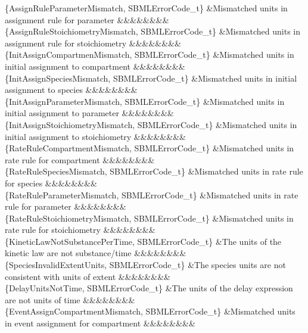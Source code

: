 \begin{DoxyParagraph}{}
\begin{longtabu}
\{Assign\+Rule\+Parameter\+Mismatch, S\+B\+M\+L\+Error\+Code\+\_\+t\} &Mismatched units in assignment rule for parameter &&&&&&&&\\
\{Assign\+Rule\+Stoichiometry\+Mismatch, S\+B\+M\+L\+Error\+Code\+\_\+t\} &Mismatched units in assignment rule for stoichiometry &&&&&&&&\\
\{Init\+Assign\+Compartmen\+Mismatch, S\+B\+M\+L\+Error\+Code\+\_\+t\} &Mismatched units in initial assignment to compartment &&&&&&&&\\
\{Init\+Assign\+Species\+Mismatch, S\+B\+M\+L\+Error\+Code\+\_\+t\} &Mismatched units in initial assignment to species &&&&&&&&\\
\{Init\+Assign\+Parameter\+Mismatch, S\+B\+M\+L\+Error\+Code\+\_\+t\} &Mismatched units in initial assignment to parameter &&&&&&&&\\
\{Init\+Assign\+Stoichiometry\+Mismatch, S\+B\+M\+L\+Error\+Code\+\_\+t\} &Mismatched units in initial assignment to stoichiometry &&&&&&&&\\
\{Rate\+Rule\+Compartment\+Mismatch, S\+B\+M\+L\+Error\+Code\+\_\+t\} &Mismatched units in rate rule for compartment &&&&&&&&\\
\{Rate\+Rule\+Species\+Mismatch, S\+B\+M\+L\+Error\+Code\+\_\+t\} &Mismatched units in rate rule for species &&&&&&&&\\
\{Rate\+Rule\+Parameter\+Mismatch, S\+B\+M\+L\+Error\+Code\+\_\+t\} &Mismatched units in rate rule for parameter &&&&&&&&\\
\{Rate\+Rule\+Stoichiometry\+Mismatch, S\+B\+M\+L\+Error\+Code\+\_\+t\} &Mismatched units in rate rule for stoichiometry &&&&&&&&\\
\{Kinetic\+Law\+Not\+Substance\+Per\+Time, S\+B\+M\+L\+Error\+Code\+\_\+t\} &The units of the kinetic law are not \textquotesingle{}substance\textquotesingle{}/\textquotesingle{}time\textquotesingle{} &&&&&&&&\\
\{Species\+Invalid\+Extent\+Units, S\+B\+M\+L\+Error\+Code\+\_\+t\} &The species\textquotesingle{} units are not consistent with units of extent &&&&&&&&\\
\{Delay\+Units\+Not\+Time, S\+B\+M\+L\+Error\+Code\+\_\+t\} &The units of the delay expression are not units of time &&&&&&&&\\
\{Event\+Assign\+Compartment\+Mismatch, S\+B\+M\+L\+Error\+Code\+\_\+t\} &Mismatched units in event assignment for compartment &&&&&&&&\\

\end{longtabu}
\end{DoxyParagraph}
